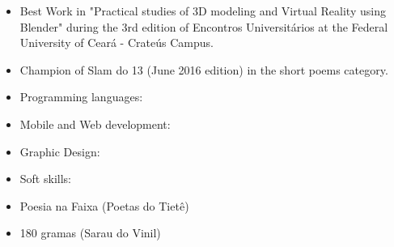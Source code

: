 \vspace{0.5 mm}
\begin{itemize}
\item Best Work in "Practical studies of 3D modeling and Virtual Reality using Blender" during the 3rd edition of Encontros Universitários at the Federal University of Ceará - Crateús Campus.
\smallskip
\item Champion of Slam do 13 (June 2016 edition) in the short poems category.
\end{itemize}

\begin{itemize}
\item Programming languages:
\end{itemize}

\vspace{2.5 mm}

\begin{itemize}
\item Mobile and Web development:
\end{itemize}

\vspace{2.5 mm}

\begin{itemize}
\item Graphic Design:
\end{itemize}

\vspace{2.5 mm}

\begin{itemize}
\item Soft skills:
\end{itemize}

\vspace{3 mm}

\smallskip
{}
\smallskip
{}
\begin{itemize}
\item Poesia na Faixa (Poetas do Tietê)
\item 180 gramas (Sarau do Vinil)
\end{itemize}

